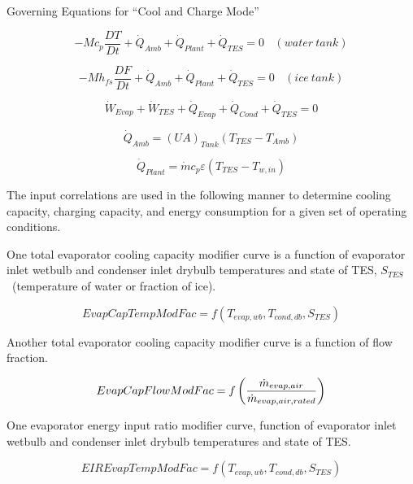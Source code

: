Governing Equations for ``Cool and Charge Mode''

\begin{equation}
-M{c_p}\frac{{DT}}{{Dt}} + {\dot Q_{Amb}} + {\dot Q_{Plant}} + {\dot Q_{TES}} = 0 ~~~~ (water~tank)
\end{equation}

\begin{equation}
-M{h_{fs}}\frac{{DF}}{{Dt}} + {\dot Q_{Amb}} + {\dot Q_{Plant}} + {\dot Q_{TES}} = 0 ~~~~ (ice~tank)
\end{equation}

\begin{equation}
{\dot W_{Evap}} + {\dot W_{TES}} + {\dot Q_{Evap}} + {\dot Q_{Cond}} + {\dot Q_{TES}} = 0
\end{equation}

\begin{equation}
{\dot Q_{Amb}} = {\left( {UA} \right)_{Tank}}\left( {{T_{TES}} - {T_{Amb}}} \right)
\end{equation}

\begin{equation}
  {\dot Q_{Plant}} = \dot m{c_p}\varepsilon \left( {{T_{TES}} - {T_{w,in}}} \right)
\end{equation}

The input correlations are used in the following manner to determine cooling capacity, charging capacity, and energy consumption for a given set of operating conditions.

One total evaporator cooling capacity modifier curve is a function of evaporator inlet wetbulb and condenser inlet drybulb temperatures and state of TES, \({S_{TES}}\) ~(temperature of water or fraction of ice).

\begin{equation}
EvapCapTempModFac = f\left( {{T_{evap,wb}},{T_{cond,db}},{S_{TES}}} \right)
\end{equation}

Another total evaporator cooling capacity modifier curve is a function of flow fraction.

\begin{equation}
EvapCapFlowModFac = f\left(\frac{\dot{m}_{evap,air}}{\dot{m}_{evap,air,rated}}\right)
\end{equation}

One evaporator energy input ratio modifier curve, function of evaporator inlet wetbulb and condenser inlet drybulb temperatures and state of TES.

\begin{equation}
EIREvapTempModFac = f\left( {{T_{evap,wb}},{T_{cond,db}},{S_{TES}}} \right)
\end{equation}

